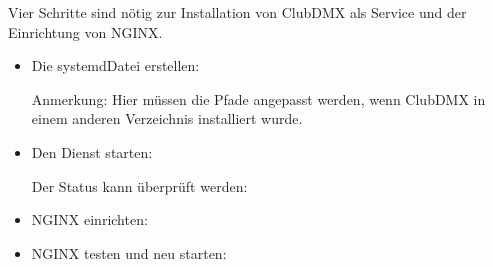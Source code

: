 \documentclass[letterpaper,10pt,ngerman]{sphinxmanual}
\begin{document}
Vier Schritte sind nötig zur Installation von ClubDMX als Service und der
Einrichtung von NGINX.
\begin{itemize}
\item {} 
Die systemd\sphinxhyphen{}Datei erstellen:


Anmerkung: Hier müssen die Pfade angepasst werden, wenn ClubDMX
in einem anderen Verzeichnis installiert wurde.

\item {} 
Den Dienst starten:

\begin{sphinxVerbatim}[commandchars=\\\{\}]
   
   
\end{sphinxVerbatim}

Der Status kann überprüft werden:

\item {} 
NGINX einrichten:

\begin{sphinxVerbatim}[commandchars=\\\{\}]
   
    
  
\end{sphinxVerbatim}

\item {} 
NGINX testen und neu starten:

\begin{sphinxVerbatim}[commandchars=\\\{\}]
  
   
\end{sphinxVerbatim}

\end{itemize}
\end{document}

